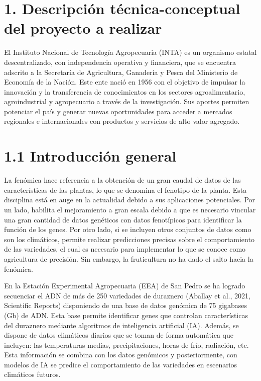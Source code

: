 \documentclass[
11pt, %
]{charter}
\begin{document}
\pagebreak

\section{1. Descripción técnica-conceptual del proyecto a realizar}
\label{sec:descripcion}

El Instituto Nacional de Tecnología Agropecuaria (INTA) es un organismo estatal descentralizado, con independencia operativa y financiera, que se encuentra adscrito a la Secretaría de Agricultura, Ganadería y Pesca del Ministerio de Economía de la Nación. Este ente nació en 1956 con el objetivo de impulsar la innovación y la transferencia de conocimientos en los sectores agroalimentario, agroindustrial y agropecuario a través de la investigación. Sus aportes permiten potenciar el país y generar nuevas oportunidades para acceder a mercados regionales e internacionales con productos y servicios de alto valor agregado.

\section{1.1 Introducción general}
\label{sec:descripcion}

La fenómica hace referencia a la obtención de un gran caudal de datos de las características de las plantas, lo que se denomina el fenotipo de la planta. Esta disciplina está en auge en la actualidad debido a sus aplicaciones potenciales. Por un lado, habilita el mejoramiento a gran escala debido a que es necesario vincular una gran cantidad de datos genéticos con datos fenotípicos para identificar la función de los genes. Por otro lado, si se incluyen otros conjuntos de datos como son los climáticos, permite realizar predicciones precisas sobre el comportamiento de las variedades, el cual es necesario para implementar lo que se conoce como agricultura de precisión. Sin embargo, la fruticultura no ha dado el salto hacia la fenómica.

En la  Estación Experimental Agropecuaria (EEA) de San Pedro se ha logrado secuenciar el ADN de más de 250 variedades de duraznero (Aballay et al., 2021, Scientific Reports) disponiendo de una base de datos genómica de 75 gigabases (Gb) de ADN. Esta base permite identificar genes que controlan características del duraznero mediante algoritmos de inteligencia artificial (IA). Además, se dispone de datos climáticos diarios que se toman de forma automática que incluyen: las temperaturas medias, precipitaciones, horas de frío, radiación, etc. Esta información se combina con los datos genómicos y posteriormente, con modelos de IA se predice el comportamiento de las variedades en escenarios climáticos futuros.
\end{document}
